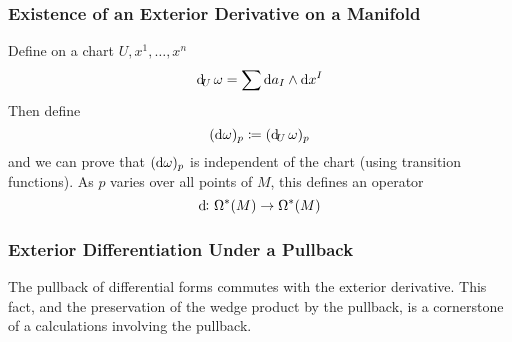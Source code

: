 \subsubsection{Existence of an Exterior Derivative on a Manifold}

Define on a chart \(U, x^1, \dots, x^n\)
\[
    \dif_U \w = \sum \dif a_I \wedge \dif x^I    
\]
Then define 
\[
    (\dif \w)_p \coloneqq (\dif_U \w)_p   
\]
and we can prove that \((\dif \w)_p\) is independent of the chart (using transition functions).
As \(p\) varies over all points of \(M\), this defines an operator 
\[
    \dif \colon \Omega^* (M)    \rightarrow \Omega^* (M)
\]

\subsubsection{Exterior Differentiation Under a Pullback}

The pullback of differential forms commutes with the exterior derivative.
This fact, and the preservation of the wedge product by the pullback, is a cornerstone of a calculations involving the pullback.

